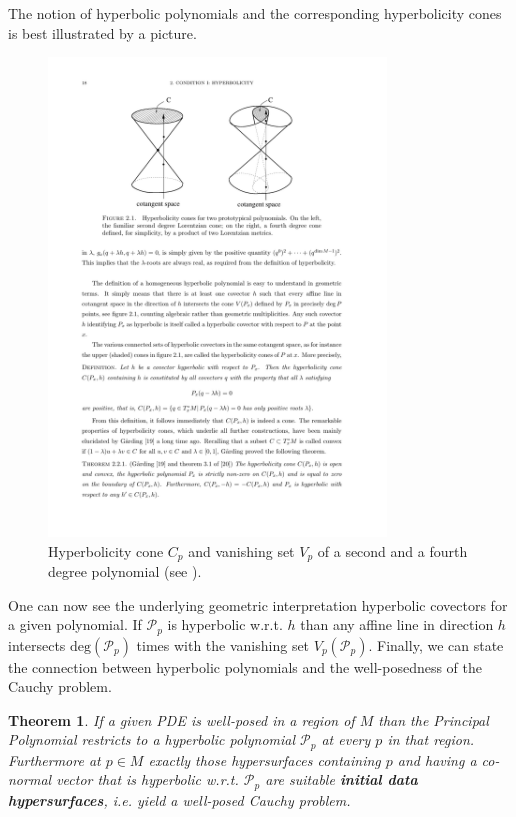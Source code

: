 \documentclass[a4paper,12pt, DIV=14, BCOR=5mm, twoside, headsepline, numbers=noenddot]{scrbook}
\newtheorem{theorem}{Theorem}[section]
\begin{document}
The notion of hyperbolic polynomials and the corresponding hyperbolicity cones is best illustrated by a picture. 
\begin{figure}[hbt!]
    \centering
    \includegraphics[width=0.8\textwidth]{Poly.pdf}
    \caption{Hyperbolicity cone $C_p$ and vanishing set $V_p$ of a second and a fourth degree polynomial (see \cite{Rivera}).}
    \label{hyperbol}
\end{figure}
One can now see the underlying geometric interpretation hyperbolic covectors for a given polynomial. If $\mathcal{P}_p$ is hyperbolic w.r.t. $h$ than any affine line in direction $h$ intersects $\mathrm{deg}(\mathcal{P}_p)$ times with the vanishing set $V_p(\mathcal{P}_p)$.
Finally, we can state the connection between hyperbolic polynomials and the well-posedness of the Cauchy problem.
\begin{theorem}
If a given PDE is well-posed in a region of $M$ than the Principal Polynomial restricts to a hyperbolic polynomial $\mathcal{P}_p$ at every $p$ in that region. Furthermore at $p \in M$ exactly those hypersurfaces containing $p$ and having a co-normal vector that is hyperbolic w.r.t. $\mathcal{P}_p$ are suitable \textit{\textbf{initial data hypersurfaces}}, i.e. yield a well-posed Cauchy problem.
\end{theorem}
\end{document}
